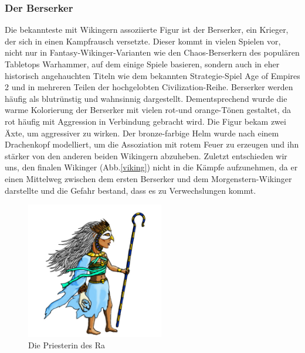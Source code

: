 \documentclass[extern,palatino]{cgBA}
\begin{document}
\subsubsection{Der Berserker}
Die bekannteste mit Wikingern assoziierte Figur ist der Berserker, ein Krieger, der sich in einen Kampfrausch versetzte. Dieser kommt in vielen Spielen vor, nicht nur in Fantasy-Wikinger-Varianten wie den Chaos-Berserkern des populären Tabletops Warhammer, auf dem einige Spiele basieren, sondern auch in eher historisch angehauchten Titeln wie dem bekannten Strategie-Spiel Age of Empires 2\cite{aoe2} und in mehreren Teilen der hochgelobten  Civilization-Reihe. Berserker werden häufig als blutrünstig und wahnsinnig dargestellt\cite{aoe2}. Dementsprechend wurde die warme Kolorierung der Berserker mit vielen rot-und orange-Tönen gestaltet, da rot häufig mit Aggression in Verbindung gebracht wird\cite{color2}. Die Figur bekam zwei Äxte, um aggressiver zu wirken. Der bronze-farbige Helm wurde nach einem Drachenkopf modelliert, um die Assoziation mit rotem Feuer zu erzeugen und ihn stärker von den anderen beiden Wikingern abzuheben. Zuletzt entschieden wir uns, den finalen Wikinger (Abb.\ref{viking}) nicht in die Kämpfe aufzunehmen, da er einen Mittelweg zwischen dem ersten Berserker und dem Morgenstern-Wikinger darstellte und die Gefahr bestand, dass es zu Verwechslungen kommt.
\newpage
\begin{figure}[H]
	\centering
	\includegraphics[height=6cm]{priestess.jpg}
	\caption{Die Priesterin des Ra}
	\label{priestess}
\end{figure}
\end{document}
